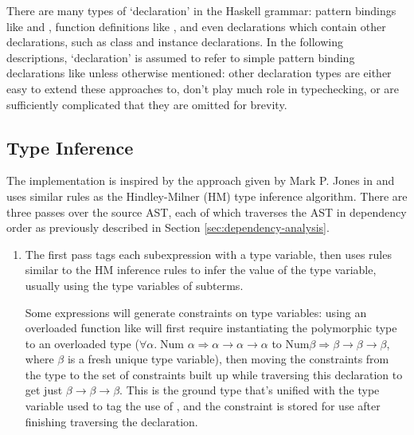 \documentclass[dissertation.tex]{subfiles}
\begin{document}
{    

    There are many types of `declaration' in the Haskell grammar: pattern bindings like  and , function definitions like , and even declarations which contain
    other declarations, such as class and instance declarations. In the following descriptions, `declaration' is assumed
    to refer to simple pattern binding declarations like  unless otherwise mentioned: other declaration
    types are either easy to extend these approaches to, don't play much role in typechecking, or are sufficiently
    complicated that they are omitted for brevity.


    \subsection{Type Inference}
    {

        The implementation is inspired by the approach given by Mark P. Jones in \cite{THIH} and uses similar rules as
        the Hindley-Milner (HM) type inference algorithm. There are three passes over the source AST, each of which
        traverses the AST in dependency order as previously described in Section \ref{sec:dependency-analysis}.

        \begin{enumerate}
        \item
        {
            
            The first pass tags each subexpression with a type variable, then uses rules similar to the HM inference
            rules to infer the value of the type variable, usually using the type variables of subterms.
            
            Some expressions will generate constraints on type variables: using an overloaded function like
            \haskell{(+)} will first require instantiating the polymorphic type to an overloaded type
            (\(\forall\alpha.\;\text{Num }\alpha\Rightarrow\alpha\rightarrow\alpha\rightarrow\alpha\) to
            \(\text{Num}\beta\Rightarrow\beta\rightarrow\beta\rightarrow\beta\), where \(\beta\) is a fresh unique type
            variable), then moving the constraints from the type to the set of constraints built up while traversing
            this declaration to get just \(\beta\rightarrow\beta\rightarrow\beta\). This is the ground type that's
            unified with the type variable used to tag the use of \haskell{(+)}, and the constraint is stored for use
            after finishing traversing the declaration.

}
\end{enumerate}}}
\end{document}
